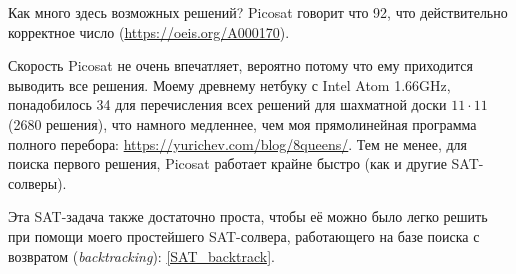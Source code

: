 Как много здесь возможных решений?
Picosat говорит что 92, что действительно корректное число (\url{https://oeis.org/A000170}).

Скорость Picosat не очень впечатляет, вероятно потому что ему приходится выводить все решения.
Моему древнему нетбуку с Intel Atom 1.66GHz, понадобилось 34 для перечисления всех решений для шахматной доски
$11 \cdot 11$ 
(2680 решения),
что намного медленнее, чем моя прямолинейная программа полного перебора: \url{https://yurichev.com/blog/8queens/}.
Тем не менее, для поиска первого решения, Picosat работает крайне быстро (как и другие SAT-солверы).

Эта SAT-задача также достаточно проста, чтобы её можно было легко решить при помощи моего простейшего
SAT-солвера, работающего на базе поиска с возвратом (\textit{backtracking}):
\ref{SAT_backtrack}.

